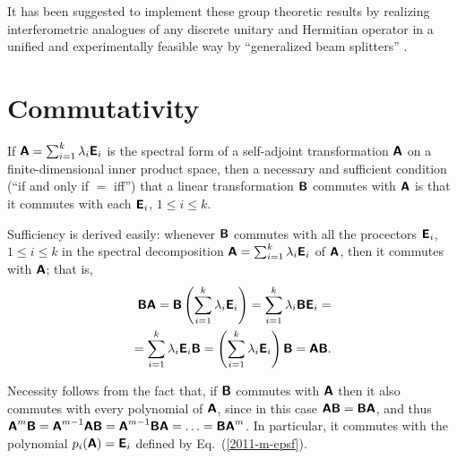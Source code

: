 {}     %
It has been suggested to implement
these group theoretic results by realizing interferometric analogues
of any discrete unitary and Hermitian operator
in a unified and experimentally feasible way by ``generalized beam splitters''   \cite{rzbb,reck-94}.









\section{Commutativity}

If $\textsf{\textbf{A}}=\sum_{i=1}^k \lambda_i\textsf{\textbf{E}}_i$
is the spectral form of a self-adjoint transformation  $\textsf{\textbf{A}}$
on a finite-dimensional inner product space,
then a necessary and sufficient condition (``if and only if $=$ iff'')
that a linear transformation
 $\textsf{\textbf{B}}$ commutes with
 $\textsf{\textbf{A}}$
is that it commutes with each
$\textsf{\textbf{E}}_i$, $1\le i\le k$.

{%
Sufficiency is derived easily: whenever   $\textsf{\textbf{B}}$
commutes with all the procectors $\textsf{\textbf{E}}_i$, $1\le i\le k$
in the spectral decomposition
$\textsf{\textbf{A}}
=
\sum_{i=1}^k \lambda_i \textsf{\textbf{E}}_i
$
of   $\textsf{\textbf{A}}$,
then it commutes with $\textsf{\textbf{A}}$; that is,
\begin{equation}
\begin{split}
 \textsf{\textbf{B}}\textsf{\textbf{A}}
=
\textsf{\textbf{B}}\left(\sum_{i=1}^k \lambda_i \textsf{\textbf{E}}_i\right)
=
\sum_{i=1}^k \lambda_i \textsf{\textbf{B}}\textsf{\textbf{E}}_i
=
\\
=
\sum_{i=1}^k \lambda_i \textsf{\textbf{E}}_i  \textsf{\textbf{B}}
=
\left(\sum_{i=1}^k \lambda_i \textsf{\textbf{E}}_i \right)  \textsf{\textbf{B}}
=\textsf{\textbf{A}} \textsf{\textbf{B}}
.
\end{split}
\end{equation}

Necessity follows from the fact that, if  $\textsf{\textbf{B}}$
commutes with  $\textsf{\textbf{A}}$
then it also commutes with every polynomial of  $\textsf{\textbf{A}}$,
since in this case $\textsf{\textbf{A}}\textsf{\textbf{B}} = \textsf{\textbf{B}} \textsf{\textbf{A}}$, and thus
$
\textsf{\textbf{A}}^m \textsf{\textbf{B}}
=
\textsf{\textbf{A}}^{m-1} \textsf{\textbf{A}} \textsf{\textbf{B}}
=
\textsf{\textbf{A}}^{m-1}  \textsf{\textbf{B}} \textsf{\textbf{A}} =
\ldots = \textsf{\textbf{B}} \textsf{\textbf{A}}^m$.
In particular, it commutes with the polynomial $p_i(\textsf{\textbf{A}})=\textsf{\textbf{E}}_i$
defined by Eq.~(\ref{2011-m-epsf}).
}

